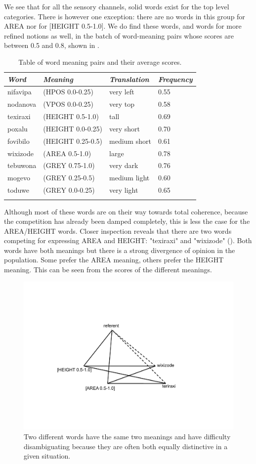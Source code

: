 We see that for all the sensory channels, solid words
exist for the top level categories. There is however
one exception: there are no words in this group for AREA
nor for [HEIGHT 0.5-1.0]. We do find these words, and 
words for more refined notions as well, in the 
batch of word-meaning pairs whose scores are between 0.5 and 0.8, shown 
in . 
\begin{table}
\begin{center}
\begin{tabular}{ l  l  l  l }
\lsptoprule
{\itshape Word}&{\itshape Meaning}& {\itshape Translation} & {\itshape Frequency} \\ \midrule
nifavipa & (HPOS 0.0-0.25) & very left & 0.55 \\ 
nodanova & (VPOS 0.0-0.25) & very top & 0.58  \\ 
texiraxi & (HEIGHT 0.5-1.0) & tall & 0.69  \\ 
poxalu & (HEIGHT 0.0-0.25) & very short & 0.70  \\ 
fovibilo & (HEIGHT 0.25-0.5) & medium short & 0.61  \\ 
wixizode & (AREA 0.5-1.0) & large & 0.78  \\ 
tebuwona & (GREY 0.75-1.0) & very dark & 0.76  \\ 
mogevo & (GREY 0.25-0.5) & medium light & 0.60  \\ 
toduwe & (GREY 0.0-0.25) & very light & 0.65  \\ 
\lspbottomrule
\end{tabular}
\caption{\label{tab:freq} Table of word meaning pairs and their average scores.}
\end{center}
\end{table}
Although most of these words are on their way towards
total coherence, because the competition has already 
been damped completely, this is less the case for 
the AREA/HEIGHT words. Closer inspection reveals that 
there are two words competing for expressing
AREA and HEIGHT: "texiraxi" and "wixizode"
(). Both words have both meanings
but there is a strong divergence of opinion in the 
population. Some prefer the AREA meaning, others prefer
the HEIGHT meaning. This can be seen from the scores of 
the different meanings.
\begin{figure}[htbp]
  \centerline{\includegraphics[width=.60\textwidth]{chap6/figs/triangle7}}
\caption{\label{triangle7} Two different words have the 
same two meanings and have difficulty disambiguating because
they are often both equally distinctive in a given situation.}
\end{figure}
